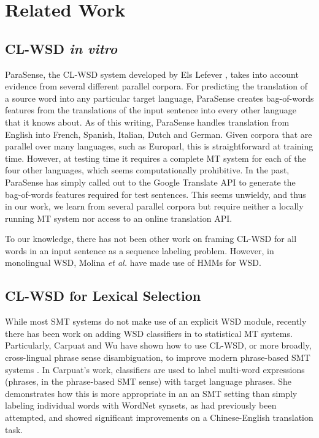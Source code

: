 \chapter{Related Work}
\label{sec:relatedwork}

\section{CL-WSD \emph{in vitro}}
ParaSense, the CL-WSD system developed by Els Lefever
\cite{lefever-hoste-decock:2011:ACL-HLT2011}, takes into account evidence from
several different parallel corpora.
For predicting the translation of a source word into
any particular target language, ParaSense creates
bag-of-words features from the translations of the input sentence into every
other language that it knows about. As of this writing, ParaSense handles
translation from English into French, Spanish, Italian, Dutch and German.
Given corpora that are parallel over many languages, such as Europarl, this is
straightforward at
training time. However, at testing time it requires a complete MT system for
each of the four other languages, which seems computationally prohibitive. In
the past, ParaSense has simply called out to the Google Translate API to
generate the bag-of-words features required for test sentences. This seems
unwieldy, and thus in our work, we learn from several parallel corpora but
require neither a locally running MT system nor access to an online translation
API.

To our knowledge, there has not been other work on framing CL-WSD for all words
in an input sentence as a sequence labeling problem. However, in monolingual
WSD, Molina \textit{et al.} \cite{DBLP:conf/iberamia/MolinaPS02} have made
use of HMMs for WSD. 


\section{CL-WSD for Lexical Selection}
While most SMT systems do not make use of an explicit WSD module, recently
there has been work on adding WSD classifiers in to statistical MT systems.
Particularly, Carpuat and Wu have shown how to use CL-WSD, or more broadly,
cross-lingual phrase sense disambiguation, to improve modern phrase-based SMT
systems
\cite{carpuatpsd,carpuat-wu:2007:EMNLP-CoNLL2007,carpuat2008evaluation}. In
Carpuat's work, classifiers are used to label multi-word expressions (phrases,
in the phrase-based SMT sense) with target language phrases. She demonstrates
how this is more appropriate in an an SMT setting than simply labeling
individual words with WordNet synsets, as had previously been attempted, and
showed significant improvements on a Chinese-English translation task.

